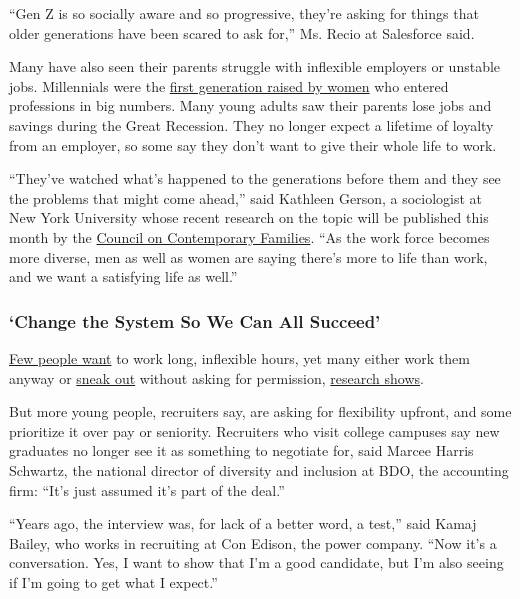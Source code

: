 ``Gen Z is so socially aware and so progressive, they're asking for
things that older generations have been scared to ask for,'' Ms. Recio
at Salesforce said.

Many have also seen their parents struggle with inflexible employers or
unstable jobs. Millennials were the
\href{https://www.nytimes3xbfgragh.onion/2015/07/23/upshot/more-than-their-mothers-young-women-plan-career-pauses.html}{first
generation raised by women} who entered professions in big numbers. Many
young adults saw their parents lose jobs and savings during the Great
Recession. They no longer expect a lifetime of loyalty from an employer,
so some say they don't want to give their whole life to work.

``They've watched what's happened to the generations before them and
they see the problems that might come ahead,'' said Kathleen Gerson, a
sociologist at New York University whose recent research on the topic
will be published this month by the
\href{https://contemporaryfamilies.org/wp-content/uploads/2019/09/Parents-Cant-Go-It-Alone-Symposium-2019-Full.pdf}{Council
on Contemporary Families}. ``As the work force becomes more diverse, men
as well as women are saying there's more to life than work, and we want
a satisfying life as well.''

\hypertarget{change-the-system-so-we-can-all-succeed}{%
\subsubsection{`Change the System So We Can All
Succeed'}\label{change-the-system-so-we-can-all-succeed}}

\href{https://www.rand.org/pubs/research_briefs/RB9973.html}{Few people
want} to work long, inflexible hours, yet many either work them anyway
or
\href{https://www.nytimes3xbfgragh.onion/2015/05/05/upshot/how-some-men-fake-an-80-hour-workweek-and-why-it-matters.html}{sneak
out} without asking for permission,
\href{https://pubsonline.informs.org/doi/abs/10.1287/orsc.2015.0975}{research
shows}.

But more young people, recruiters say, are asking for flexibility
upfront, and some prioritize it over pay or seniority. Recruiters who
visit college campuses say new graduates no longer see it as something
to negotiate for, said Marcee Harris Schwartz, the national director of
diversity and inclusion at BDO, the accounting firm: ``It's just assumed
it's part of the deal.''

``Years ago, the interview was, for lack of a better word, a test,''
said Kamaj Bailey, who works in recruiting at Con Edison, the power
company. ``Now it's a conversation. Yes, I want to show that I'm a good
candidate, but I'm also seeing if I'm going to get what I expect.''

